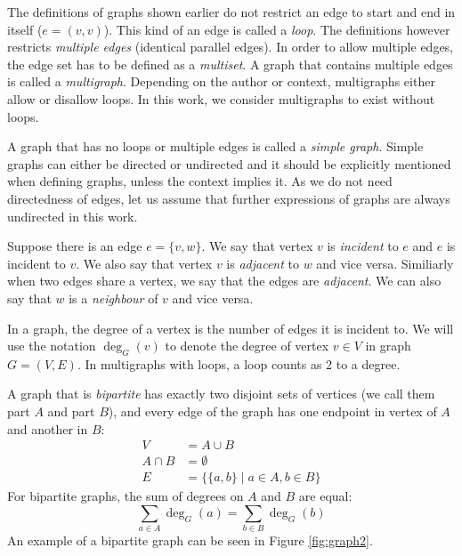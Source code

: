 The definitions of graphs shown earlier do not restrict an edge to start and end in itself ($e=(v, v)$).
This kind of an edge is called a \emph{loop}.
The definitions however restricts \emph{multiple edges} (identical parallel edges).
In order to allow multiple edges, the edge set has to be defined as a \emph{multiset}.
A graph that contains multiple edges is called a \emph{multigraph}.
Depending on the author or context, multigraphs either allow or disallow loops.
In this work, we consider multigraphs to exist without loops.

A graph that has no loops or multiple edges is called a \emph{simple graph}.
Simple graphs can either be directed or undirected and it should be explicitly mentioned when defining graphs, unless the context implies it.
As we do not need directedness of edges, let us assume that further expressions of graphs are always undirected in this work.

Suppose there is an edge $e=\{v,w\}$.
We say that vertex $v$ is \emph{incident} to $e$ and $e$ is incident to $v$.
We also say that vertex $v$ is \emph{adjacent} to $w$ and vice versa.
Similiarly when two edges share a vertex, we say that the edges are \emph{adjacent}.
We can also say that $w$ is a \emph{neighbour} of $v$ and vice versa.

In a graph, the degree of a vertex is the number of edges it is incident to.
We will use the notation $\deg_G(v)$ to denote the degree of vertex $v \in V$ in graph $G=(V,E)$.
In multigraphs with loops, a loop counts as 2 to a degree.

A graph that is \emph{bipartite} has exactly two disjoint sets of vertices (we call them part $A$ and part $B$), and every edge of the graph has one endpoint in vertex of $A$ and another in $B$:
\begin{align}
V &= A \cup B\\
A \cap B &= \emptyset\\
E &=\{\{a, b\} \mid a \in A, b \in B\}
\end{align}
For bipartite graphs, the sum of degrees on $A$ and $B$ are equal:
\begin{equation}
\sum_{a\in A} \deg_G(a) = \sum_{b\in B} \deg_G(b)
\end{equation}
An example of a bipartite graph can be seen in Figure \ref{fig:graph2}.


